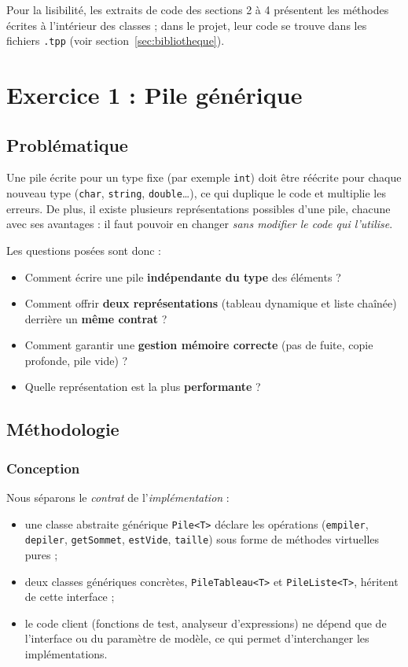 \documentclass[11pt,a4paper]{article}
\newcommand{\code}[1]{\texttt{#1}}
\begin{document}
\noindent Pour la lisibilité, les extraits de code des sections 2 à 4
présentent les méthodes écrites à l'intérieur des classes ; dans le projet,
leur code se trouve dans les fichiers \code{.tpp}
(voir section~\ref{sec:bibliotheque}).

\section{Exercice 1 : Pile générique}

\subsection{Problématique}

Une pile écrite pour un type fixe (par exemple \code{int}) doit être
réécrite pour chaque nouveau type (\code{char}, \code{string},
\code{double}\dots), ce qui duplique le code et multiplie les erreurs.
De plus, il existe plusieurs représentations possibles d'une pile, chacune
avec ses avantages : il faut pouvoir en changer \emph{sans modifier le code
qui l'utilise}.

Les questions posées sont donc :
\begin{itemize}
  \item Comment écrire une pile \textbf{indépendante du type} des éléments ?
  \item Comment offrir \textbf{deux représentations} (tableau dynamique et
        liste chaînée) derrière un \textbf{même contrat} ?
  \item Comment garantir une \textbf{gestion mémoire correcte}
        (pas de fuite, copie profonde, pile vide) ?
  \item Quelle représentation est la plus \textbf{performante} ?
\end{itemize}

\subsection{Méthodologie}

\subsubsection{Conception}

Nous séparons le \emph{contrat} de l'\emph{implémentation} :
\begin{itemize}
  \item une classe abstraite générique \code{Pile<T>} déclare les opérations
        (\code{empiler}, \code{depiler}, \code{getSommet}, \code{estVide},
        \code{taille}) sous forme de méthodes virtuelles pures ;
  \item deux classes génériques concrètes, \code{PileTableau<T>} et
        \code{PileListe<T>}, héritent de cette interface ;
  \item le code client (fonctions de test, analyseur d'expressions) ne dépend
        que de l'interface ou du paramètre de modèle, ce qui permet
        d'interchanger les implémentations.
\end{itemize}
\end{document}
